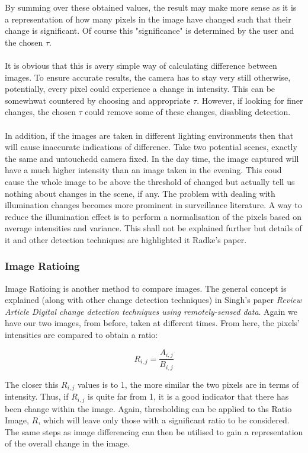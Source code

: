 \documentclass[11pt]{report}
\begin{document}
By summing over these obtained values, the result may make more
sense as it is a representation of how many pixels in the image have
changed such that their change is significant. Of course this
"significance" is determined by the user and the chosen $\tau$.\\
\\
It is obvious that this is avery simple way of calculating difference
between images. To ensure accurate results, the camera has to stay
very still otherwise, potentially, every pixel could experience a 
change in intensity. This can be somewhwat countered by choosing
and appropriate $\tau$. However, if looking for finer changes, the
chosen $\tau$ could remove some of these changes, disabling detection.\\
\\
In addition, if the images are taken in different lighting environments
then that will cause inaccurate indications of difference. Take two
potential scenes, exactly the same and untouchedd camera fixed. In
the day time, the image captured will have a much higher intensity
than an image taken in the evening. This coud cause the whole image
to be above the threshold of changed but actually tell us nothing 
about changes in the scene, if any. The problem with dealing with
illumination changes becomes more prominent in surveillance literature.
A way to reduce the illumination effect is to perform a normalisation
of the pixels based on average intensities and variance. This shall
not be explained further but details of it and other detection 
techniques are highlighted it Radke's paper\cite{Radke04}.

\subsubsection*{Image Ratioing}
Image Ratioing is another method to compare images. The general concept
is explained (along with other change detection techniques) in Singh's
paper \textit{Review Article Digital change detection techniques 
using remotely-sensed data}\cite{Singh88}. Again we have our two images,
from before, taken at different times. From here, the pixels' intensities
are compared to obtain a ratio:

\begin{equation}
	R_{i,j} = \frac{A_{i,j}}{B_{i,j}}
\end{equation}

The closer this $R_{i,j}$ values is to 1, the more similar the two 
pixels are in terms of intensity. Thus, if $R_{i,j}$ is quite far from 
1, it is a good indicator that there has been change within the image.
Again, thresholding can be applied to ths Ratio Image, $R$, which will 
leave only those with a significant ratio to be considered. The same steps
as image differencing can then be utilised to gain a representation of the
overall change in the image.
\end{document}
